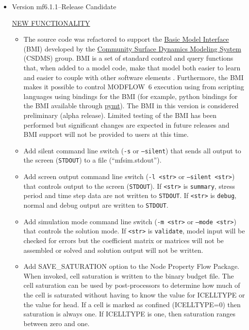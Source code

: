 \documentclass[11pt,twoside,twocolumn]{usgsreport}
\begin{document}
\begin{itemize}
	\item Version mf6.1.1--Release Candidate

	\underline{NEW FUNCTIONALITY}
	\begin{itemize}
		\item The source code was refactored to support the \href{https://csdms.colorado.edu/wiki/BMI_Description}{Basic Model Interface} (BMI) developed by the \href{https://csdms.colorado.edu/wiki/Main_Page}{Community Surface Dynamics Modeling System} (CSDMS) group. BMI is a set of standard control and query functions that, when added to a model code, make that model both easier to learn and easier to couple with other software elements \citep{PECKHAM20133}. Furthermore, the BMI makes it possible to control MODFLOW~6 execution using from scripting languages using bindings for the BMI (for example, python bindings for the BMI available through \href{https://csdms.colorado.edu/wiki/PyMT}{pymt}). The BMI in this version is considered preliminary (alpha release). Limited testing of the BMI has been performed but significant changes are expected in future releases and BMI support will not be provided to users at this time.
		\item Add silent command line switch (\texttt{-s} or \texttt{--silent}) that sends all output to the screen (\texttt{STDOUT})  to a file (``mfsim.stdout'').
		\item Add screen output command line switch (\texttt{-l <str>} or \texttt{--silent <str>}) that controls output to the screen (\texttt{STDOUT}). If \texttt{<str>}  is \texttt{summary}, stress period and time step data are not written to \texttt{STDOUT}. If \texttt{<str>} is \texttt{debug}, normal and debug output are written to \texttt{STDOUT}. 
		\item Add simulation mode command line switch (\texttt{-m <str>} or \texttt{--mode <str>}) that controls the solution mode. If \texttt{<str>}  is \texttt{validate}, model input will be checked for errors but the coefficient matrix or matrices will not be assembled or solved and solution output will not be written.
		\item Add SAVE\_SATURATION option to the Node Property Flow Package.  When invoked, cell saturation is written to the binary budget file.  The cell saturation can be used by post-processors to determine how much of the cell is saturated without having to know the value for ICELLTYPE or the value for head. If a cell is marked as confined (ICELLTYPE=0) then saturation is always one. If ICELLTYPE is one, then saturation ranges between zero and one.

\end{itemize}
\end{itemize}
\end{document}
